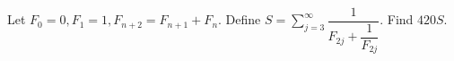 Let $F_0=0,F_1=1,F_{n+2}=F_{n+1}+F_n$. Define $S=\sum_{j=3}^{\infty}\dfrac{1}{F_{2j}+\dfrac{1}{F_{2j}}}$. Find $420S$.
